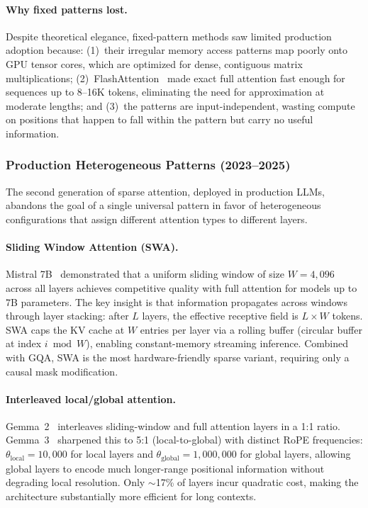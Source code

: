 \paragraph{Why fixed patterns lost.}
Despite theoretical elegance, fixed-pattern methods saw limited production adoption because: (1)~their irregular memory access patterns map poorly onto GPU tensor cores, which are optimized for dense, contiguous matrix multiplications; (2)~FlashAttention~\cite{dao2022flashattention} made exact full attention fast enough for sequences up to 8--16K tokens, eliminating the need for approximation at moderate lengths; and (3)~the patterns are input-independent, wasting compute on positions that happen to fall within the pattern but carry no useful information.

\subsubsection{Production Heterogeneous Patterns (2023--2025)}

The second generation of sparse attention, deployed in production LLMs, abandons the goal of a single universal pattern in favor of heterogeneous configurations that assign different attention types to different layers.

\paragraph{Sliding Window Attention (SWA).}
Mistral 7B~\cite{jiang2023mistral} demonstrated that a uniform sliding window of size $W = 4{,}096$ across all layers achieves competitive quality with full attention for models up to 7B parameters. The key insight is that information propagates across windows through layer stacking: after $L$ layers, the effective receptive field is $L \times W$ tokens. SWA caps the KV cache at $W$ entries per layer via a rolling buffer (circular buffer at index $i \bmod W$), enabling constant-memory streaming inference. Combined with GQA, SWA is the most hardware-friendly sparse variant, requiring only a causal mask modification.

\paragraph{Interleaved local/global attention.}
Gemma~2~\cite{gemma2024improving} interleaves sliding-window and full attention layers in a 1:1 ratio. Gemma~3~\cite{gemma2025gemma3} sharpened this to 5:1 (local-to-global) with distinct RoPE frequencies: $\theta_{\text{local}} = 10{,}000$ for local layers and $\theta_{\text{global}} = 1{,}000{,}000$ for global layers, allowing global layers to encode much longer-range positional information without degrading local resolution. Only ${\sim}$17\% of layers incur quadratic cost, making the architecture substantially more efficient for long contexts.

